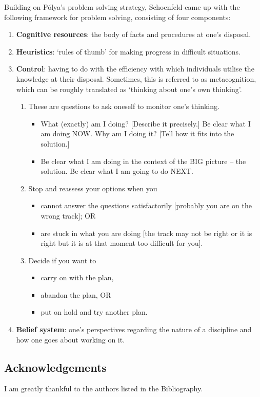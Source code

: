 Building on P\'{o}lya's problem solving strategy, Schoenfeld \cite{schoenfeld} came up with the following framework for problem solving, consisting of four components:
\begin{enumerate}
\item \textbf{Cognitive resources}: the body of facts and procedures at one's disposal.
\item \textbf{Heuristics}: `rules of thumb' for making progress in difficult situations.
\item \textbf{Control}: having to do with the efficiency with which individuals utilise the knowledge at their disposal. Sometimes, this is referred to as metacognition, which can be roughly translated as `thinking about one's own thinking'.
\begin{enumerate}
\item These are questions to ask oneself to monitor one's thinking.
\begin{itemize}
    \item What (exactly) am I doing? [Describe it precisely.] Be clear what I am doing NOW. Why am I doing it? [Tell how it fits into the solution.]
    \item Be clear what I am doing in the context of the BIG picture -- the solution. Be clear what I am going to do NEXT.
\end{itemize}

\item Stop and reassess your options when you
\begin{itemize}
    \item cannot answer the questions satisfactorily [probably you are on the wrong track]; OR
    \item are stuck in what you are doing [the track may not be right or it is right but it is at that moment too difficult for you].
\end{itemize}

\item Decide if you want to
\begin{itemize}
    \item carry on with the plan,
    \item abandon the plan, OR
    \item put on hold and try another plan.
\end{itemize}
\end{enumerate}

\item \textbf{Belief system}: one's perspectives regarding the nature of a discipline and how one goes about working on it.
\end{enumerate}

\subsection*{Acknowledgements}
I am greatly thankful to the authors listed in the Bibliography.
\pagebreak